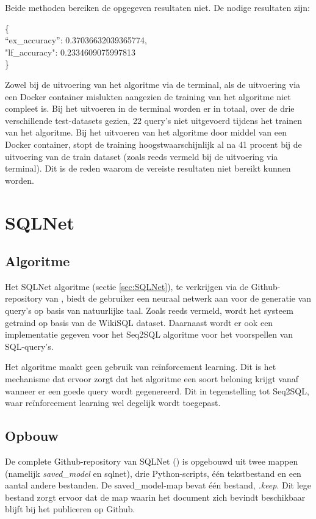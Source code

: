 Beide methoden bereiken de opgegeven resultaten niet. De nodige resultaten zijn:

\{ \\
“ex\_accuracy”: 0.37036632039365774, \\
"lf\_accuracy": 0.2334609075997813 \\
\}

Zowel bij de uitvoering van het algoritme via de terminal, als de uitvoering via een Docker container mislukten aangezien de training van het algoritme niet compleet is. Bij het uitvoeren in de terminal worden er in totaal, over de drie verschillende test-datasets gezien, 22 query's niet uitgevoerd tijdens het trainen van het algoritme. Bij het uitvoeren van het algoritme door middel van een Docker container, stopt de training hoogstwaarschijnlijk al na 41 procent bij de uitvoering van de train dataset (zoals reeds vermeld bij de uitvoering via terminal). Dit is de reden waarom de vereiste resultaten niet bereikt kunnen worden.  

\section{SQLNet}
\label{sec:sqlnet}

\subsection{Algoritme}

Het SQLNet algoritme (sectie \ref{sec:SQLNet}), te verkrijgen via de Github-repository van \textcite{sqlnet}, biedt de gebruiker een neuraal netwerk aan voor de generatie van query's op basis van natuurlijke taal. Zoals reeds vermeld, wordt het systeem getraind op basis van de WikiSQL dataset. Daarnaast wordt er ook een implementatie gegeven voor het Seq2SQL algoritme voor het voorspellen van SQL-query's.

Het algoritme maakt geen gebruik van reïnforcement learning. Dit is het mechanisme dat ervoor zorgt dat het algoritme een soort beloning krijgt vanaf wanneer er een goede query wordt gegenereerd. Dit in tegenstelling tot Seq2SQL, waar reïnforcement learning wel degelijk wordt toegepast.

\subsection{Opbouw}

De complete Github-repository van SQLNet (\textcite{sqlnet}) is opgebouwd uit twee mappen (namelijk \textit{saved\_model} en sqlnet), drie Python-scripts, één tekstbestand en een aantal andere bestanden. De saved\_model-map bevat één bestand, \textit{.keep}. Dit lege bestand zorgt ervoor dat de map waarin het document zich bevindt beschikbaar blijft bij het publiceren op Github.

